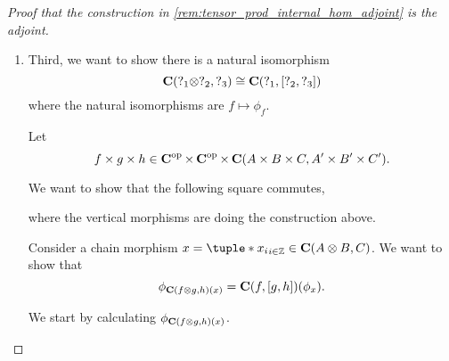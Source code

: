 \begin{proof}[Proof that the construction in \autoref{rem:tensor_prod_internal_hom_adjoint} is the adjoint]
\begin{enumerate}
{            By a similar argument, doing the reverse construction as above and going back again yields the same morphism, therefore \( f \mapsto \phi_f \) is a bijection.

            Finally, notice that every step of the construction is \( R \)-linear, therefore \( f \mapsto \phi_f \) is an isomorphism of modules.
        }
        \item {
            Third, we want to show there is a natural isomorphism
            \[
                \operatorname{\mathbf{C}}(?_1 \otimes ?_2, ?_3) \cong \operatorname{\mathbf{C}}(?_1, \left[ ?_2, ?_3 \right])
            \]
            where the natural isomorphisms are \( f \mapsto \phi_f \).

            Let
            \[
                f \times g \times h \in \operatorname{\mathbf{C}}^{\operatorname{op}} \times \operatorname{\mathbf{C}}^{\operatorname{op}} \times \operatorname{\mathbf{C}} (A \times B \times C, A' \times B' \times C').
            \]

            We want to show that the following square commutes,
            \begin{center}
            \end{center}
            where the vertical morphisms are doing the construction above.

            Consider a chain morphism \( x = \tuple*{x_i}_{i \in \Zb} \in \C(A \otimes B, C) \). We want to show that
            \[
                \phi_{\operatorname{\mathbf{C}}(f \otimes g, h) (x)} = \operatorname{\mathbf{C}}(f, [g, h]) (\phi_x).
            \]

            We start by calculating \( \phi_{\operatorname{\mathbf{C}}(f \otimes g, h) (x)} \).

}
\end{enumerate}
\end{proof}
